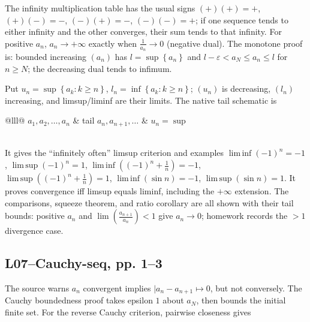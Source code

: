 The infinity multiplication table has the usual signs \(( + )( + ) = +\), \(( + )( - ) = -\), \(( - )( + ) = -\), \(( - )( - ) = +\); if one sequence tends to either infinity and the other converges, their sum tends to that infinity. For positive \(a_{n}\), \(a_{n}\rightarrow + \infty\) exactly when \(\frac{1}{a_{n}}\rightarrow 0\) (negative dual). The monotone proof is: bounded increasing \(\left( a_{n} \right)\) has \(l = \sup\left\{ a_{n} \right\}\) and \(l - \varepsilon < a_{N} \leq a_{n} \leq l\) for \(n \geq N\); the decreasing dual tends to infimum.

Put \(u_{n} = \sup\left\{ {a_{k}:k \geq n} \right\}\), \(l_{n} = \inf\left\{ {a_{k}:k \geq n} \right\}\); \(\left( u_{n} \right)\) is decreasing, \(\left( l_{n} \right)\) increasing, and limsup/liminf are their limits. The native tail schematic is

{\def\LTcaptype{none} %
\begin{longtable}[]{@{}lll@{}}
\toprule\noalign{}
\endhead
\bottomrule\noalign{}
\endlastfoot
\(a_{1},a_{2},\ldots,a_{n}\) & tail \(a_{n},a_{n + 1},\ldots\) & \(u_{n} = \sup\) \\
 \\
\end{longtable}
}

It gives the ``infinitely often'' limsup criterion and examples \({\operatorname{lim\, inf}\left( {- 1} \right)}^{n} = - 1\), \({\operatorname{lim\, sup}\left( {- 1} \right)}^{n} = 1\), \(\operatorname{lim\, inf}\left( {\left( {- 1} \right)^{n} + \frac{1}{n}} \right) = - 1\), \(\operatorname{lim\, sup}\left( {\left( {- 1} \right)^{n} + \frac{1}{n}} \right) = 1\), \(\operatorname{lim\, inf}\left( {\sin n} \right) = - 1\), \(\operatorname{lim\, sup}\left( {\sin n} \right) = 1\). It proves convergence iff limsup equals liminf, including the \(+ \infty\) extension. The comparisons, squeeze theorem, and ratio corollary are all shown with their tail bounds: positive \(a_{n}\) and \(\lim\left( \frac{a_{n + 1}}{a_{n}} \right) < 1\) give \(a_{n}\rightarrow 0\); homework records the \(> 1\) divergence case.

\subsection{L07--Cauchy-seq, pp. 1--3}

The source warns \(a_{n}\) convergent implies \(|a_{n} - a_{n + 1}\mapsto 0\), but not conversely. The Cauchy boundedness proof takes epsilon \(1\) about \(a_{N}\), then bounds the initial finite set. For the reverse Cauchy criterion, pairwise closeness gives

